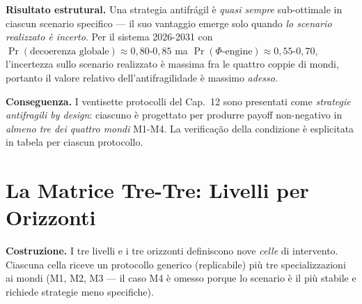 \Proved{} \textbf{Risultato estrutural.} Una strategia antifrágil è
\emph{quasi sempre} sub-ottimale in ciascun scenario specifico --- il
suo vantaggio emerge solo quando \emph{lo scenario realizzato è
incerto}. Per il sistema 2026-2031 con
\(\Pr(\text{decoerenza globale}) \approx 0{,}80\)-\(0{,}85\) ma
\(\Pr(\Phi\text{-engine}) \approx 0{,}55\)-\(0{,}70\), l'incertezza
sullo scenario realizzato è massima fra le quattro coppie di mondi,
portanto il valore relativo dell'antifragilidade è massimo \emph{adesso}.

\Hypoth{} \textbf{Conseguenza.} I ventisette protocolli del Cap.~12 sono
presentati come \emph{strategie antifragili by design}: ciascuno è
progettato per produrre payoff non-negativo in \emph{almeno tre dei
quattro mondi} M1-M4. La verificação della condizione è esplicitata in
tabela per ciascun protocollo.



\section{La Matrice Tre-Tre: Livelli per
Orizzonti}\label{la-matrice-tre-tre-livelli-per-orizzonti}

\Hypoth{} \textbf{Costruzione.} I tre livelli e i tre orizzonti
definiscono nove \emph{celle} di intervento. Ciascuna cella riceve un
protocollo generico (replicabile) più tre specializzazioni ai mondi (M1,
M2, M3 --- il caso M4 è omesso porque lo scenario è il più stabile e
richiede strategie meno specifiche).

